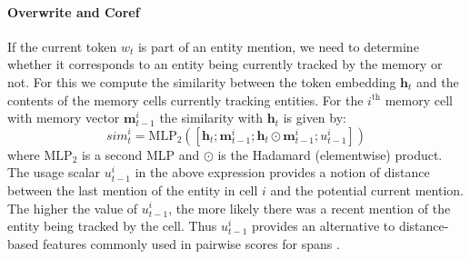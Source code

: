 \documentclass[12pt]{thesis-umich}[thesis]
\def\vec#1{\ensuremath{\boldsymbol{{#1}}}}
\newcommand{\mysim}{\mathit{sim}}
\newcommand{\mlp}{\mathrm{MLP}}
\begin{document}
\paragraph{Overwrite and Coref}
If the current token $w_t$ is part of an entity mention, we need to determine whether it corresponds to an entity being currently tracked by the memory or not.
For this we compute the similarity between the token embedding $\vec{h}_t$ and the contents of the memory cells currently tracking entities.
For the $i^\textrm{th}$ memory cell with memory vector $\vec{m}_{t-1}^i$ the similarity with $\vec{h}_t$ is given by:\begin{equation} \label{sim_eqn}
	\mysim_{t}^{i} = \mlp_2([\vec{h}_t; \vec{m}_{t-1}^{i};
	\vec{h}_t \odot \vec{m}_{t-1}^{i}; u_{t-1}^i])
\end{equation}
where $\mlp_2$ is a second MLP and $\odot$ is the Hadamard (elementwise) product.
The usage scalar $u_{t-1}^i$ in the above expression provides a notion of distance between the last mention of the entity in cell $i$ and the potential current mention.
The higher the value of $u_{t-1}^i$, the more likely
there was a recent mention of the entity being tracked by the cell.
Thus $u_{t-1}^i$ provides an alternative to distance-based features commonly used in pairwise scores for spans
\citep{lee-etal-2017-end}.
\end{document}
